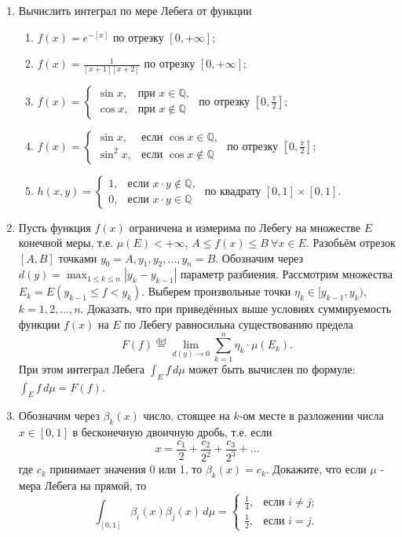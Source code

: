 \documentclass[12pt,a4paper]{article}
\begin{document}
\begin{enumerate}
\item Вычислить интеграл по мере Лебега от функции
\begin{enumerate}[label=\alph*)]
\item $f(x) = e^{-[x]}$ по отрезку $[0, +\infty]$;
\item $f(x) = \frac{1}{[x+1][x+2]}$ по отрезку $[0, +\infty]$;
\item $f(x) =
\begin{cases} \sin x, & \text{при } x \in \mathbb{Q}, \\ \cos x, & \text{при } x \notin \mathbb{Q}
\end{cases}$ по отрезку $[0, \frac{\pi}{2}]$;
\item $f(x) =
\begin{cases} \sin x, & \text{если } \cos x \in \mathbb{Q}, \\ \sin^{2}x, & \text{если } \cos x \notin \mathbb{Q}
\end{cases}$ по отрезку $[0, \frac{\pi}{2}]$;
\item $h(x,y) =
\begin{cases} 1, & \text{если } x \cdot y \notin \mathbb{Q}, \\ 0, & \text{если } x \cdot y \in \mathbb{Q}
\end{cases}$ по квадрату $[0,1] \times [0,1]$.
\end{enumerate}

\item Пусть функция $f(x)$ ограничена и измерима по Лебегу на множестве $E$ конечной меры, т.е. $\mu(E) < +\infty$, $A \le f(x) \le B \ \forall x \in E$. Разобьём отрезок $[A, B]$ точками $y_{0} = A, y_{1}, y_{2}, \dots, y_{n} = B$. Обозначим через $d(y) = \max_{1 \le k \le n} |y_{k} - y_{k-1}|$ параметр разбиения. Рассмотрим множества $E_{k} = E(y_{k-1} \le f < y_{k})$. Выберем произвольные точки $\eta_{k} \in [y_{k-1}, y_{k})$, $k=1, 2, \dots, n$. Доказать, что при приведённых выше условиях суммируемость функции $f(x)$ на $E$ по Лебегу равносильна существованию предела
$$F(f) \overset{\text{def}}{=} \lim_{d(y) \rightarrow 0} \sum_{k=1}^{n} \eta_{k} \cdot \mu(E_{k}).$$
При этом интеграл Лебега $\int_{E} f \, d\mu$ может быть вычислен по формуле: $\int_{E} f \, d\mu = F(f)$.

\item Обозначим через $\beta_{k}(x)$ число, стоящее на $k$-ом месте в разложении числа $x \in [0,1]$ в бесконечную двоичную дробь, т.е. если
$$x = \frac{c_{1}}{2} + \frac{c_{2}}{2^{2}} + \frac{c_{3}}{2^{3}} + \dots$$
где $c_{k}$ принимает значения 0 или 1, то $\beta_{k}(x) = c_{k}$. Докажите, что если $\mu$ - мера Лебега на прямой, то
$$ \int_{[0,1]} \beta_{i}(x)\beta_{j}(x) \, d\mu =
\begin{cases} \frac{1}{4}, & \text{если } i \ne j; \\ \frac{1}{2}, & \text{если } i = j.
\end{cases} $$


\end{enumerate}
\end{document}
